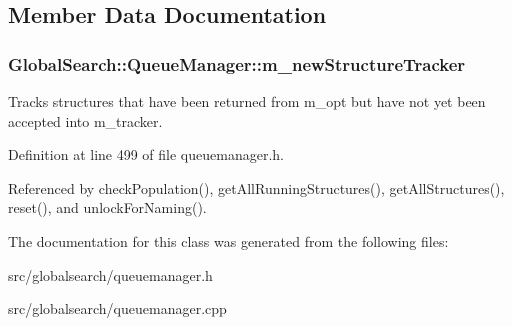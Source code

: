 \subsection{Member Data Documentation}
\hypertarget{classGlobalSearch_1_1QueueManager_ab93522c4a198ea3401baf662b00a7ec7}{
\subsubsection[{m\-\_\-new\-Structure\-Tracker}]{ Global\-Search\-::\-Queue\-Manager\-::m\-\_\-new\-Structure\-Tracker\hspace{0.3cm}{\ttfamily [protected]}}}\label{classGlobalSearch_1_1QueueManager_ab93522c4a198ea3401baf662b00a7ec7}
Tracks structures that have been returned from m\-\_\-opt but have not yet been accepted into m\-\_\-tracker. 

Definition at line 499 of file queuemanager.\-h.



Referenced by check\-Population(), get\-All\-Running\-Structures(), get\-All\-Structures(), reset(), and unlock\-For\-Naming().



The documentation for this class was generated from the following files\-:\begin{DoxyCompactItemize}
\item 
src/globalsearch/queuemanager.\-h\item 
src/globalsearch/queuemanager.\-cpp\end{DoxyCompactItemize}
